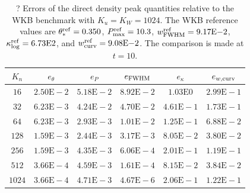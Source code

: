 \documentclass[11pt]{article}
\begin{document}
\begin{table}[htbp]
\centering
\caption{? Errors of the direct density peak quantities relative to the WKB benchmark with \(K_u=K_W=1024\). The WKB reference values are \(\theta_*^{\rm ref}=0.350\), \(P_{\max}^{\rm ref}=10.3\), \(w_{\rm FWHM}^{\rm ref}=9.17\mathrm{E}{-}2\), \(\kappa_{\log}^{\rm ref}=6.73\mathrm{E}{2}\), and \(w_{\rm curv}^{\rm ref}=9.08\mathrm{E}{-}2\). The comparison is made at \(t=10\).}
\label{tab:direct_peak_errors_wkb_ref}
\small
\begin{tabular}{c c c c c c}
\hline
\(K_n\) & \(e_{\theta}\) & \(e_P\) & \(e_{\rm FWHM}\) & \(e_{\kappa}\) & \(e_{w,\rm curv}\) \\
\hline
\(16\)   & \(2.50\mathrm{E}{-}2\) & \(5.18\mathrm{E}{-}2\) & \(8.92\mathrm{E}{-}2\) & \(1.03\mathrm{E}{0}\)  & \(2.99\mathrm{E}{-}1\) \\
\(32\)   & \(6.23\mathrm{E}{-}3\) & \(4.24\mathrm{E}{-}2\) & \(4.70\mathrm{E}{-}2\) & \(4.61\mathrm{E}{-}1\) & \(1.73\mathrm{E}{-}1\) \\
\(64\)   & \(6.23\mathrm{E}{-}3\) & \(2.93\mathrm{E}{-}3\) & \(1.01\mathrm{E}{-}2\) & \(1.25\mathrm{E}{-}1\) & \(6.88\mathrm{E}{-}2\) \\
\(128\)  & \(1.59\mathrm{E}{-}3\) & \(2.44\mathrm{E}{-}3\) & \(3.17\mathrm{E}{-}3\) & \(8.05\mathrm{E}{-}2\) & \(3.80\mathrm{E}{-}2\) \\
\(256\)  & \(1.59\mathrm{E}{-}3\) & \(4.35\mathrm{E}{-}3\) & \(6.06\mathrm{E}{-}4\) & \(2.01\mathrm{E}{-}1\) & \(1.19\mathrm{E}{-}1\) \\
\(512\)  & \(3.66\mathrm{E}{-}4\) & \(4.59\mathrm{E}{-}3\) & \(1.61\mathrm{E}{-}4\) & \(8.15\mathrm{E}{-}2\) & \(3.84\mathrm{E}{-}2\) \\
\(1024\) & \(3.66\mathrm{E}{-}4\) & \(4.71\mathrm{E}{-}3\) & \(4.67\mathrm{E}{-}6\) & \(2.06\mathrm{E}{-}1\) & \(1.22\mathrm{E}{-}1\) \\
\hline
\end{tabular}
\end{table}
\end{document}
